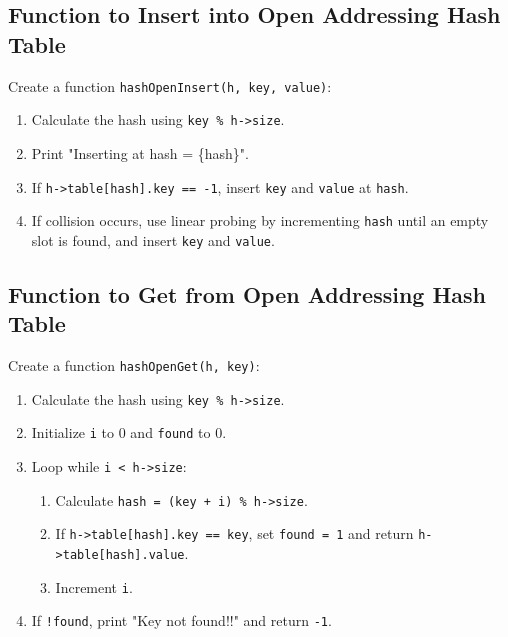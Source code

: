 {  \subsection{Function to Insert into Open Addressing Hash Table}
  Create a function \texttt{hashOpenInsert(h, key, value)}:
  \begin{enumerate}[label=\arabic*.,left=0pt]
    \item Calculate the hash using \texttt{key \% h->size}.
    \item Print "Inserting at hash = \{hash\}".
    \item If \texttt{h->table[hash].key == -1}, insert \texttt{key} and \texttt{value} at \texttt{hash}.
    \item If collision occurs, use linear probing by incrementing \texttt{hash} until an empty slot is found, and insert \texttt{key} and \texttt{value}.
  \end{enumerate}

  \subsection{Function to Get from Open Addressing Hash Table}
  Create a function \texttt{hashOpenGet(h, key)}:
  \begin{enumerate}[label=\arabic*.,left=0pt]
    \item Calculate the hash using \texttt{key \% h->size}.
    \item Initialize \texttt{i} to 0 and \texttt{found} to 0.
    \item Loop while \texttt{i < h->size}:
          \begin{enumerate}[label=3.\arabic*.,left=0pt]
            \item Calculate \texttt{hash = (key + i) \% h->size}.
            \item If \texttt{h->table[hash].key == key}, set \texttt{found = 1} and return \texttt{h->table[hash].value}.
            \item Increment \texttt{i}.
          \end{enumerate}
    \item If \texttt{!found}, print "Key not found!!" and return \texttt{-1}.
  \end{enumerate}

}
